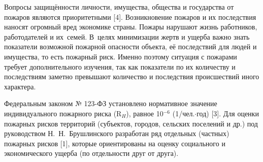 



\makeProcTitleIINewLine
{}

Вопросы защищённости личности, имущества, общества и государства от пожаров являются приоритетными [4]. Возникновение пожаров и их последствия наносят огромный вред экономике страны. Пожары нарушают жизнь работников, работодателей и их семей. В~целях минимизации жертв и ущерба важно знать показатели возможной пожарной опасности объекта, её последствий для людей и имущества, то есть пожарный риск. Именно поэтому ситуация с пожарами требует дополнительного изучения, так как показатели по их количеству и последствиям заметно превышают количество и последствия происшествий иного характера.

Федеральным законом № 123-ФЗ установлено нормативное значение индивидуального пожарного риска (R$_H$), равное 10$^{-6}$ (1/чел.$\cdot$год) [3]. Для оценки пожарных рисков территорий (субъектов, городов, сельских поселений и др.) под руководством Н.~Н.~Брушлинского разработан ряд отдельных (частных) пожарных рисков [1], которые ориентированы на оценку социального и экономического ущерба (по отдельности друг от друга).

